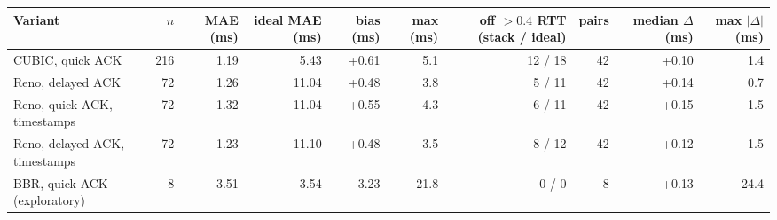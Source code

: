 \begin{tabular}{@{}lrrrrrrrrr@{}}
\toprule
Variant & $n$ & MAE (ms) & ideal MAE (ms) & bias (ms) & max (ms) & off $>0.4$ RTT (stack / ideal) & pairs & median $\Delta$ (ms) & max $|\Delta|$ (ms) \\
\midrule
CUBIC, quick ACK & 216 & 1.19 & 5.43 & +0.61 & 5.1 & 12 / 18 & 42 & +0.10 & 1.4 \\
Reno, delayed ACK & 72 & 1.26 & 11.04 & +0.48 & 3.8 & 5 / 11 & 42 & +0.14 & 0.7 \\
Reno, quick ACK, timestamps & 72 & 1.32 & 11.04 & +0.55 & 4.3 & 6 / 11 & 42 & +0.15 & 1.5 \\
Reno, delayed ACK, timestamps & 72 & 1.23 & 11.10 & +0.48 & 3.5 & 8 / 12 & 42 & +0.12 & 1.5 \\
BBR, quick ACK (exploratory) & 8 & 3.51 & 3.54 & -3.23 & 21.8 & 0 / 0 & 8 & +0.13 & 24.4 \\
\bottomrule
\end{tabular}
